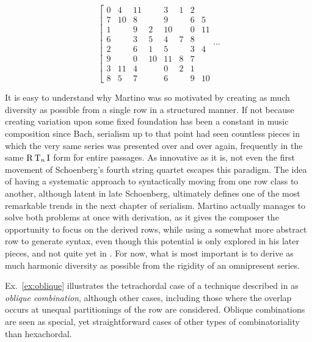 \begin{example}
    \begin{equation}
    	\left[
    	\begin{array}{cc|cc|cc|cc|}
        	0 & 4 & 11 && 3 & 1 & 2 & \\
        	7 & 10 & 8 && 9 && 6 & 5 \\
        	1 && 9 & 2 & 10 && 0 & 11 \\
        	6 && 3 & 5 & 4 & 7 & 8 & \\
        	2 && 6 & 1 & 5 && 3 & 4 \\
        	9 && 0 & 10 & 11 & 8 & 7 & \\
        	3 & 11 & 4 && 0 & 2 & 1 & \\
        	8 & 5 & 7 && 6 && 9 & 10
    	\end{array}
    	\right. \cdots
	\end{equation}
\end{example}

It is easy to understand why Martino was so motivated by creating as much diversity as possible from a single row in a structured manner. If not because creating variation upon some fixed foundation has been a constant in music composition since Bach, serialism up to that point had seen countless pieces in which the very same series was presented over and over again, frequently in the same $\operatorname{R}\operatorname{T}_n\operatorname{I}$ form for entire passages. As innovative as it is, not even the first movement of Schoenberg's fourth string quartet escapes this paradigm. The idea of having a systematic approach to syntactically moving from one row class to another, although latent in late Schoenberg, ultimately defines one of the most remarkable trends in the next chapter of serialism. Martino actually manages to solve both problems at once with derivation, as it gives the composer the opportunity to focus on the derived rows, while using a somewhat more abstract row to generate syntax, even though this potential is only explored in his later pieces, and not quite yet in \cite{Martino1961}. For now, what is most important is to derive as much harmonic diversity as possible from the rigidity of an omnipresent series.

Ex.~\ref{ex:oblique} illustrates the tetrachordal case of a technique described in \cite[241]{Martino1961} as \emph{oblique combination}, although other cases, including those where the overlap occurs at unequal partitionings of the row are considered. Oblique combinations are seen as special, yet straightforward cases of other types of combinatoriality \cite[267]{Martino1961} than hexachordal.

